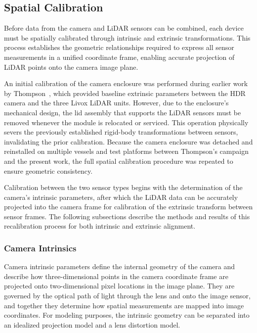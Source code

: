\documentclass{erauthesis}
\begin{document}
\subsection{Spatial Calibration} \label{spatial_calibration}

Before data from the camera and \ac{LiDAR} sensors can be combined, each device must be spatially calibrated through intrinsic and extrinsic transformations.  
This process establishes the geometric relationships required to express all sensor measurements in a unified coordinate frame, enabling accurate projection of \ac{LiDAR} points onto the camera image plane.

An initial calibration of the camera enclosure was performed during earlier work by Thompson~\cite{thompson2023}, which provided baseline extrinsic parameters between the HDR camera and the three Livox LiDAR units.  
However, due to the enclosure’s mechanical design, the lid assembly that supports the LiDAR sensors must be removed whenever the module is relocated or serviced.  
This operation physically severs the previously established rigid-body transformations between sensors, invalidating the prior calibration.  
Because the camera enclosure was detached and reinstalled on multiple vessels and test platforms between Thompson’s campaign and the present work, the full spatial calibration procedure was repeated to ensure geometric consistency. %

Calibration between the two sensor types begins with the determination of the camera’s intrinsic parameters, after which the LiDAR data can be accurately projected into the camera frame for calibration of the extrinsic transform between sensor frames.  
The following subsections describe the methods and results of this recalibration process for both intrinsic and extrinsic alignment.

\subsubsection{Camera Intrinsics} \label{camera_intrinsics}

Camera intrinsic parameters define the internal geometry of the camera and describe how three-dimensional points in the camera coordinate frame are projected onto two-dimensional pixel locations in the image plane.  
They are governed by the optical path of light through the lens and onto the image sensor, and together they determine how spatial measurements are mapped into image coordinates.  
For modeling purposes, the intrinsic geometry can be separated into an idealized projection model and a lens distortion model.
\end{document}
